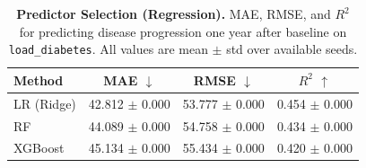 \begin{table}[ht]
\centering
\caption{\textbf{Predictor Selection (Regression).} MAE, RMSE, and $R^2$ for predicting disease progression one year after baseline on \texttt{load\_diabetes}. All values are mean $\pm$ std over available seeds.}
\label{tab:reg_results}
\renewcommand{\arraystretch}{1.2}
\begin{tabular}{lccc}
\toprule
\textbf{Method} & \textbf{MAE} $\downarrow$ & \textbf{RMSE} $\downarrow$ & \textbf{$R^2$} $\uparrow$ \\
\midrule
LR (Ridge) & 42.812 $\pm$ 0.000 & 53.777 $\pm$ 0.000 & 0.454 $\pm$ 0.000 \\
RF & 44.089 $\pm$ 0.000 & 54.758 $\pm$ 0.000 & 0.434 $\pm$ 0.000 \\
XGBoost & 45.134 $\pm$ 0.000 & 55.434 $\pm$ 0.000 & 0.420 $\pm$ 0.000 \\
\bottomrule
\end{tabular}
\end{table}
